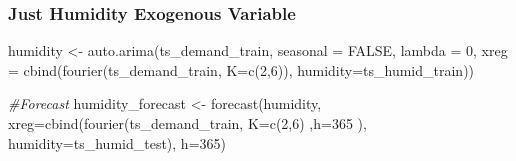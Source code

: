 \documentclass[
]{article}
\newenvironment{Shaded}{\begin{snugshade}}{\end{snugshade}}
\newcommand{\AttributeTok}[1]{\textcolor[rgb]{0.77,0.63,0.00}{#1}}
\newcommand{\CommentTok}[1]{\textcolor[rgb]{0.56,0.35,0.01}{\textit{#1}}}
\newcommand{\ConstantTok}[1]{\textcolor[rgb]{0.00,0.00,0.00}{#1}}
\newcommand{\DecValTok}[1]{\textcolor[rgb]{0.00,0.00,0.81}{#1}}
\newcommand{\FunctionTok}[1]{\textcolor[rgb]{0.00,0.00,0.00}{#1}}
\newcommand{\NormalTok}[1]{#1}
\newcommand{\OtherTok}[1]{\textcolor[rgb]{0.56,0.35,0.01}{#1}}
\newcommand{\SpecialCharTok}[1]{\textcolor[rgb]{0.00,0.00,0.00}{#1}}
\newcommand{\StringTok}[1]{\textcolor[rgb]{0.31,0.60,0.02}{#1}}
\begin{document}
\begin{Shaded}
\end{Shaded}

\hypertarget{just-humidity-exogenous-variable}{%
\subsubsection{Just Humidity Exogenous
Variable}\label{just-humidity-exogenous-variable}}

\begin{Shaded}
\begin{Highlighting}[]
\NormalTok{humidity }\OtherTok{\textless{}{-}} \FunctionTok{auto.arima}\NormalTok{(ts\_demand\_train,}
                  \AttributeTok{seasonal =} \ConstantTok{FALSE}\NormalTok{, }
                  \AttributeTok{lambda =} \DecValTok{0}\NormalTok{,}
         \AttributeTok{xreg =} \FunctionTok{cbind}\NormalTok{(}\FunctionTok{fourier}\NormalTok{(ts\_demand\_train, }
                                          \AttributeTok{K=}\FunctionTok{c}\NormalTok{(}\DecValTok{2}\NormalTok{,}\DecValTok{6}\NormalTok{)),}
               \AttributeTok{humidity=}\NormalTok{ts\_humid\_train))}

\CommentTok{\#Forecast }
\NormalTok{humidity\_forecast }\OtherTok{\textless{}{-}} \FunctionTok{forecast}\NormalTok{(humidity,}
                           \AttributeTok{xreg=}\FunctionTok{cbind}\NormalTok{(}\FunctionTok{fourier}\NormalTok{(ts\_demand\_train, }
                                          \AttributeTok{K=}\FunctionTok{c}\NormalTok{(}\DecValTok{2}\NormalTok{,}\DecValTok{6}\NormalTok{)}
\NormalTok{                                          ,}\AttributeTok{h=}\DecValTok{365} 
\NormalTok{                                         ),}
                                \AttributeTok{humidity=}\NormalTok{ts\_humid\_test),}
                           \AttributeTok{h=}\DecValTok{365}\NormalTok{) }
\end{Highlighting}
\end{Shaded}
\end{document}
